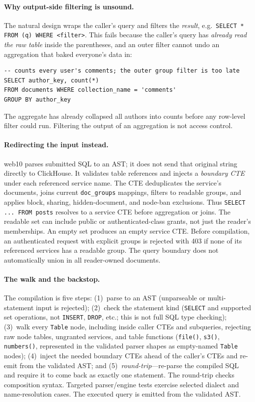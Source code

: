 \documentclass[sigconf, nonacm]{acmart}
\begin{document}
\paragraph{Why output-side filtering is unsound.} The natural design wraps the
caller's query and filters the \emph{result}, e.g.\
\texttt{SELECT * FROM (q) WHERE <filter>}. This fails because the caller's
query has \emph{already read the raw table} inside the parentheses, and an
outer filter cannot undo an aggregation that baked everyone's data in:
\begin{lstlisting}[style=sql]
-- counts every user's comments; the outer group filter is too late
SELECT author_key, count(*)
FROM documents WHERE collection_name = 'comments'
GROUP BY author_key
\end{lstlisting}
The aggregate has already collapsed all authors into counts before any row-level
filter could run. Filtering the output of an aggregation is not access control.

\paragraph{Redirecting the input instead.} web10 parses submitted SQL to an
AST; it does not send that original string directly to ClickHouse. It validates
table references and injects a \emph{boundary CTE} under each referenced service
name. The CTE deduplicates the service's documents, joins current
\texttt{doc\_groups} mappings, filters to readable groups, and applies block,
sharing, hidden-document, and node-ban exclusions. Thus
\texttt{SELECT ... FROM posts} resolves to a service CTE before aggregation or
joins. The readable set can include public or authenticated-class grants, not
just the reader's memberships. An empty set produces an empty service CTE.
Before compilation, an authenticated request with explicit groups is rejected
with 403 if none of its referenced services has a readable group. The query
boundary does not automatically union in all reader-owned documents.

\paragraph{The walk and the backstop.} The compilation is five steps: (1)~parse
to an AST (unparseable or multi-statement input is rejected); (2)~check the
statement kind (\texttt{SELECT} and supported set operations, not
\texttt{INSERT}, \texttt{DROP}, etc.; this is not full SQL type checking);
(3)~walk every \texttt{Table} node, including inside caller CTEs and subqueries,
rejecting raw node tables, ungranted services, and table functions
(\texttt{file()}, \texttt{s3()}, \texttt{numbers()}, represented in the
validated parser shapes as empty-named \texttt{Table} nodes);
(4)~inject the needed boundary CTEs ahead of the caller's CTEs and re-emit from
the validated AST; and (5)~\emph{round-trip}---re-parse the compiled SQL and
require it to come back as exactly one statement. The round-trip checks
composition syntax. Targeted parser/engine tests exercise selected dialect and
name-resolution cases. The executed query is emitted from
the validated AST.
\end{document}
